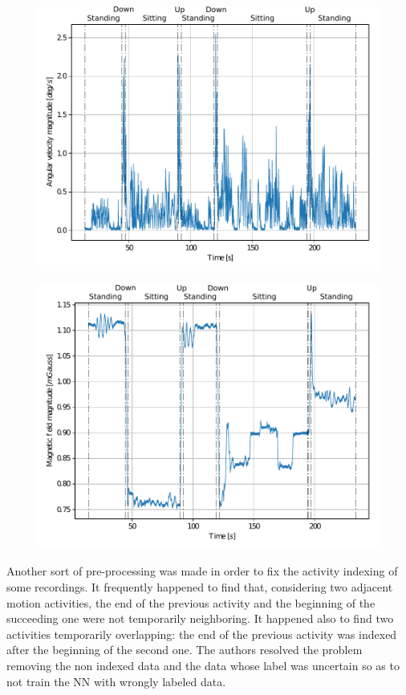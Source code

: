 \documentclass[10pt, conference, letterpaper]{IEEEtran}
\begin{document}
\begin{figure}
\includegraphics[scale=0.55]{angular_velocity_susanna.pdf}
\caption{}
\label{fig:gyr}
\end{figure}

\begin{figure}
\includegraphics[scale=0.55]{magnetic_field_susanna.pdf}
\caption{}
\label{fig:mag}
\end{figure}


Another sort of pre-processing was made in order to fix the activity indexing of some recordings. It frequently happened to find that, considering two adjacent motion activities, the end of the previous activity and the beginning of the succeeding one were not temporarily neighboring. It happened also to find two activities temporarily overlapping: the end of the previous activity was indexed after the beginning of the second one. 
The authors resolved the problem removing the non indexed data and the data whose label was uncertain so as to not train the NN with wrongly labeled data.
\end{document}
